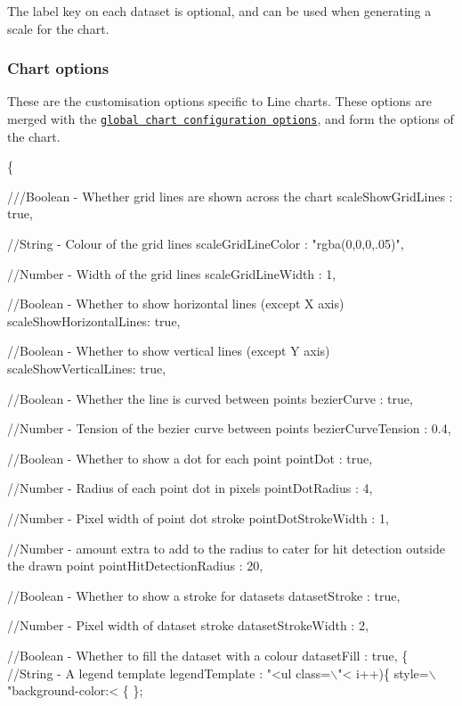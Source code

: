 The label key on each dataset is optional, and can be used when generating a scale for the chart.

\subsubsection*{Chart options}

These are the customisation options specific to Line charts. These options are merged with the \href{#getting-started-global-chart-configuration}{\tt global chart configuration options}, and form the options of the chart.


\begin{DoxyCode}
\{

    ///Boolean - Whether grid lines are shown across the chart
    scaleShowGridLines : true,

    //String - Colour of the grid lines
    scaleGridLineColor : "rgba(0,0,0,.05)",

    //Number - Width of the grid lines
    scaleGridLineWidth : 1,

    //Boolean - Whether to show horizontal lines (except X axis)
    scaleShowHorizontalLines: true,

    //Boolean - Whether to show vertical lines (except Y axis)
    scaleShowVerticalLines: true,

    //Boolean - Whether the line is curved between points
    bezierCurve : true,

    //Number - Tension of the bezier curve between points
    bezierCurveTension : 0.4,

    //Boolean - Whether to show a dot for each point
    pointDot : true,

    //Number - Radius of each point dot in pixels
    pointDotRadius : 4,

    //Number - Pixel width of point dot stroke
    pointDotStrokeWidth : 1,

    //Number - amount extra to add to the radius to cater for hit detection outside the drawn point
    pointHitDetectionRadius : 20,

    //Boolean - Whether to show a stroke for datasets
    datasetStroke : true,

    //Number - Pixel width of dataset stroke
    datasetStrokeWidth : 2,

    //Boolean - Whether to fill the dataset with a colour
    datasetFill : true,
    \{%
    //String - A legend template
    legendTemplate : "<ul class=\(\backslash\)"<%
       i++)\{%
       style=\(\backslash\)"background-color:<%
    \{%
\};
\end{DoxyCode}


